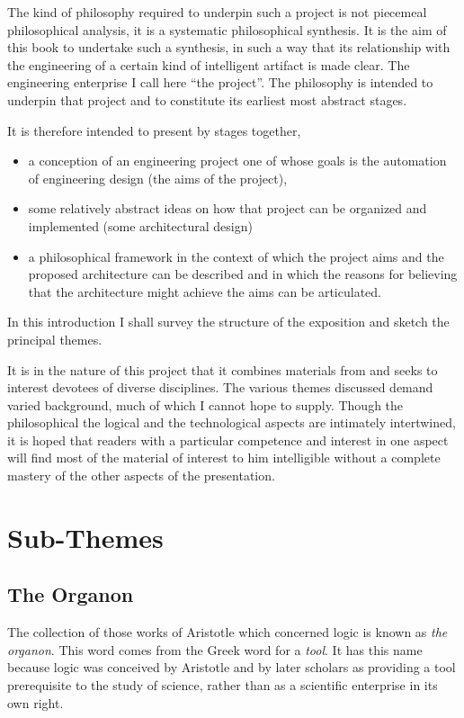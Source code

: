 The kind of philosophy required to underpin such a project is not
piecemeal philosophical analysis, it is a systematic philosophical
synthesis.
It is the aim of this book to undertake such a synthesis, in such a
way that its relationship with the engineering of a certain kind of
intelligent artifact is made clear.
The engineering enterprise I call here ``the project''.
The philosophy is intended to underpin that project and to constitute
its earliest most abstract stages.

It is therefore intended to present by stages together,
\begin{itemize}
\item a conception of an engineering project one of whose goals is the
  automation of engineering design (the aims of the project),
\item some relatively abstract ideas on how that project can be
  organized and implemented (some architectural design)
\item a philosophical framework in the context of which the project
  aims and the proposed architecture can be described and in which the
  reasons for believing that the architecture might achieve the aims
  can be articulated.
\end{itemize}

In this introduction I shall survey the structure of the exposition
and sketch the principal themes.

It is in the nature of this project that it combines materials from
and seeks to interest devotees of diverse disciplines.
The various themes discussed demand varied background, much of which I
cannot hope to supply.
Though the philosophical the logical and the technological aspects are
intimately intertwined, it is hoped that readers with a particular
competence and interest in one aspect will find most of the material
of interest to him intelligible without a complete mastery of the
other aspects of the presentation.

\section{Sub-Themes}

\subsection{The Organon}

The collection of those works of Aristotle which concerned logic is
known as {\it the organon}.
This word comes from the Greek word for a {\it tool}.
It has this name because logic was conceived by Aristotle and by later
scholars as providing a tool prerequisite to the study of science, rather than as a scientific enterprise in its own right.

